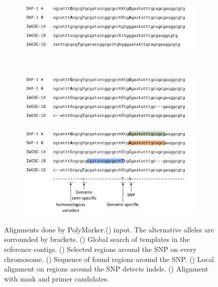 \begin{figure}
    \begin{subfigure}[b]{0.4\textwidth}
        \includegraphics[width=1\textwidth]{PolyMarker/Figures/aln/scaffoldsFound.pdf}
        \caption{}
        \label{fig:poly:globalSequence}
    \end{subfigure}
    ~ %
    \begin{subfigure}[b]{0.4\textwidth}
        \includegraphics[width=1\textwidth]{PolyMarker/Figures/aln/localAlignment.pdf} 
        \caption{}
        \label{fig:poly:localSequence}
    \end{subfigure}

    \begin{subfigure}[b]{0.8\textwidth}
        \includegraphics[width=1\textwidth]{PolyMarker/Figures/aln/mask.pdf} 
        \caption{}
        \label{fig:poly:mask}
    \end{subfigure}
    \caption{Alignments done by PolyMarker.() input. The alternative alleles are sorrounded by brackets. () Global search of templates in the reference contigs. () Selected regions around the SNP on every chromosome. () Sequence of found regions around the SNP. () Local alignment on regions around the SNP detects indels. () Alignment with mask and primer candidates.}
    \label{fig:global}
\end{figure}


